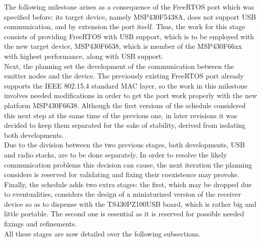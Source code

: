 	The following milestone arises as a consequence of the FreeRTOS port which was specified before: its
	target device, namely MSP430F5438A, does not support USB communication, and by extension the port itself.
	Thus, the work for this stage consists of providing FreeRTOS with USB support, which is to be employed
	with the new target device, MSP430F6638, which is member of the MSP430F66xx with highest performance,
	along with USB support.\\
	
	Next, the planning set the development of the communication between the emitter nodes and the device.
	The previously existing FreeRTOS port already supports the IEEE 802.15.4 standard MAC layer, so the
	work in this milestone involves needed modifications in order to get the port work properly with
	the new platform MSP430F6638. Although the first versions of the schedule considered this next step 
	at the same time of the previous one, in later revisions it was decided to keep them separated for 
	the sake of stability, derived from isolating both developments.\\
	
	Due to the division between the two previous stages, both developments, USB and radio stacks, are
	to be done separately. In order to resolve the likely communication problems this decision can cause,
	the next iteration the planning considers is reserved for validating and fixing their coexistence
	may provoke.\\
	
	Finally, the schedule adds two extra stages: the first, which may be dropped due to eventualities,
	considers the design of a miniaturized version of the receiver device so as to dispense with the
	TS430PZ100USB board, which is rather big and little portable. The second one is essential as it
	is reserved for possible needed fixings and refinements.\\
	
	All these stages are now detailed over the following subsections.\\
	
	
